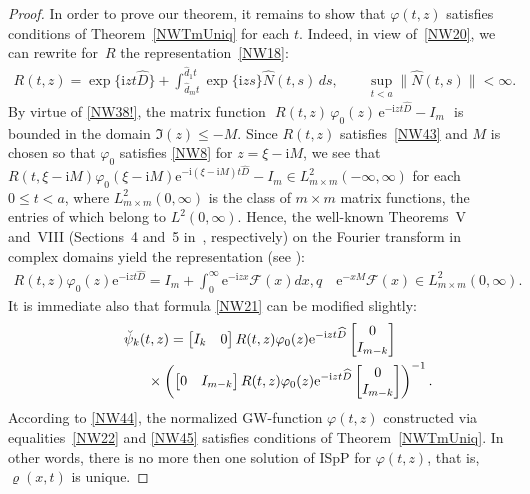 \documentclass[pdftex]{sigma}
\def\vr{\varrho}
\def\vp{\varphi}
\def\wh{\widehat}
\newcommand{\E}{\mathrm{e}}
\newcommand{\I}{\mathrm{i}}
\newcommand{\cF}{{\mathcal F}}
\numberwithin{equation}{section}
\begin{document}
\begin{proof}
In order to prove our theorem, it remains to show that $\vp(t,z)$ satisf\/ies conditions of Theo\-rem~\ref{NWTmUniq}
for each $t$. Indeed, in view of~\eqref{NW20}, we can rewrite for~$R$ the representation~\eqref{NW18}:
\begin{gather}
  R(t,z) = \exp \{ \I z t \wh D\}
    + \int_{\wh d_m t}^{\wh d_1 t}
           \exp \{\I zs\}
     \wh N(t,s)
    \, ds, \qquad \sup_{t<a} \| \wh N(t,s) \| < \infty.
 \label{NW43}
\end{gather}
By virtue of \eqref{NW38!}, the matrix function $\, \,R(t,z)\, \vp_0(z) \, \E^{-\I z t \wh D} -I_m \,\,$ is bounded in the domain
$\Im(z)\leq -M$.
Since $R(t,z)$ satisf\/ies~\eqref{NW43} and $M$ is chosen so that $\vp_0$ satisf\/ies \eqref{NW8} for $z=\xi -\I M$,
we see that $R(t,\xi-\I M)\vp_0(\xi-\I M)\E^{-\I (\xi-\I M)t \wh D} -I_m \in L^2_{m\times m}(-\infty, \infty)$
for each $0\leq t <a$,
where $L^2_{m\times m}(0,\infty)$ is the class of $m\times m$ matrix functions, the entries of which belong to $L^2(0,\infty)$.
 Hence, the well-known Theorems~V and~VIII (Sections~4 and~5 in~\cite{WP}, respectively) on the Fourier transform in complex domains
yield the
representation (see \cite[formula~(E11)]{SaSaR}):
\begin{gather}
   \label{NW44}
R(t,z)\vp_0(z)\E^{-\I z t \wh D}=I_m+\int_0^{\infty}\E^{-\I zx}\cF(x)dx, q\quad \E^{-xM}\cF(x)\in L^2_{m\times m}(0,\infty) .
\end{gather}
It is immediate also that formula \eqref{NW21} can be modif\/ied slightly:
\begin{gather}
\breve \psi_k(t,z)=
 \begin{bmatrix} I_k & 0\end{bmatrix}
R(t,z) \varphi_0 (z)\E^{-\I z t \wh D}
 \left[
  \begin{matrix}
    0  \\
    I_{m-k}
  \end{matrix}
 \right]\nonumber\\
 \hphantom{\breve \psi_k(t,z)=}{}\times
 \left(
 \begin{bmatrix} 0 & I_{m-k}\end{bmatrix}
  R(t,z) \varphi_0 (z)\E^{-\I z t \wh D}
  \left[
  \begin{matrix}
    0  \\
    I_{m-k}
  \end{matrix}
  \right]
 \right)^{-1} .\label{NW45}
\end{gather}
According to \eqref{NW44}, the normalized GW-function $\vp(t,z)$ constructed via equalities~\eqref{NW22}
and \eqref{NW45} satisf\/ies conditions of Theorem~\ref{NWTmUniq}. In other words, there is no more then
one solution of ISpP for $\vp(t,z)$, that is, $\vr(x,t)$ is unique.
\end{proof}
\end{document}
